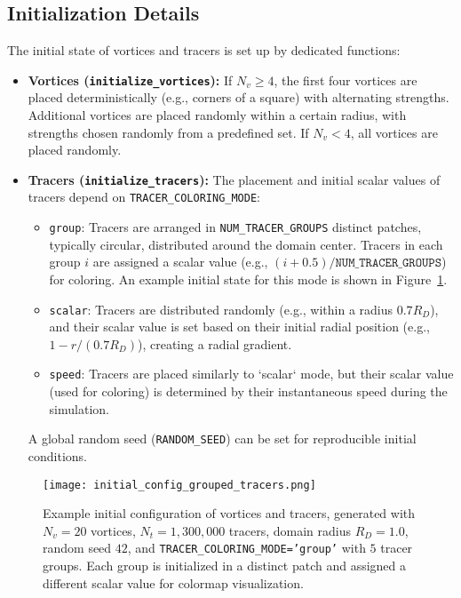 \documentclass[12pt,letterpaper]{article}
\newcommand{\domainradius}{R_D}
\begin{document}
\subsection{Initialization Details}
The initial state of vortices and tracers is set up by dedicated functions:
\begin{itemize}
    \item \textbf{Vortices (\texttt{initialize\_vortices}):}
    If $N_v \ge 4$, the first four vortices are placed deterministically (e.g., corners of a square) with alternating strengths. Additional vortices are placed randomly within a certain radius, with strengths chosen randomly from a predefined set. If $N_v < 4$, all vortices are placed randomly.
    \item \textbf{Tracers (\texttt{initialize\_tracers}):}
    The placement and initial scalar values of tracers depend on \texttt{TRACER\_COLORING\_MODE}:
    \begin{itemize}
        \item \texttt{group}: Tracers are arranged in \texttt{NUM\_TRACER\_GROUPS} distinct patches, typically circular, distributed around the domain center. Tracers in each group $i$ are assigned a scalar value (e.g., $(i+0.5)/\texttt{NUM\_TRACER\_GROUPS}$) for coloring. An example initial state for this mode is shown in Figure~\ref{fig:initial_config}.
        \item \texttt{scalar}: Tracers are distributed randomly (e.g., within a radius $0.7\domainradius$), and their scalar value is set based on their initial radial position (e.g., $1 - r/(0.7\domainradius)$), creating a radial gradient.
        \item \texttt{speed}: Tracers are placed similarly to `scalar` mode, but their scalar value (used for coloring) is determined by their instantaneous speed during the simulation.
    \end{itemize}
    A global random seed (\texttt{RANDOM\_SEED}) can be set for reproducible initial conditions.
\end{itemize}

\begin{figure}[H]
    \centering
    \texttt{[image: initial\_config\_grouped\_tracers.png]}
    \caption{Example initial configuration of vortices and tracers, generated with $N_v=20$ vortices, $N_t=1,300,000$ tracers, domain radius $\domainradius=1.0$, random seed $42$, and \texttt{TRACER\_COLORING\_MODE='group'} with $5$ tracer groups. Each group is initialized in a distinct patch and assigned a different scalar value for colormap visualization.}
    \label{fig:initial_config}
\end{figure}
\end{document}
